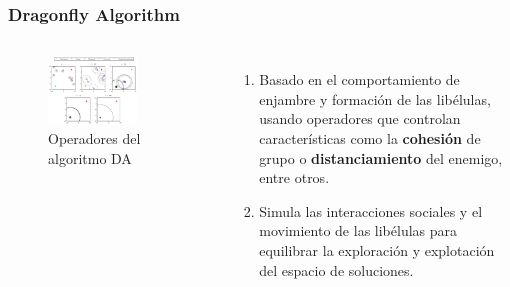 \begin{frame}
  \frametitle{Dragonfly Algorithm}
  \begin{columns}
    \begin{figure}
      \begin{center}
        \includegraphics[width=0.7\textwidth]{imagenes/chapter3/da-operators.png}
      \end{center}
      \caption{Operadores del algoritmo DA \footnotemark[10]}
    \end{figure}
    \begin{enumerate}
      \item Basado en el comportamiento de enjambre y formación de las libélulas, usando operadores que controlan características como la \textbf{cohesión} de grupo o \textbf{distanciamiento} del enemigo, entre otros.
      \item Simula las interacciones sociales y el movimiento de las libélulas para equilibrar la exploración y explotación del espacio de soluciones.
    \end{enumerate}
  \end{columns}
\end{frame}

